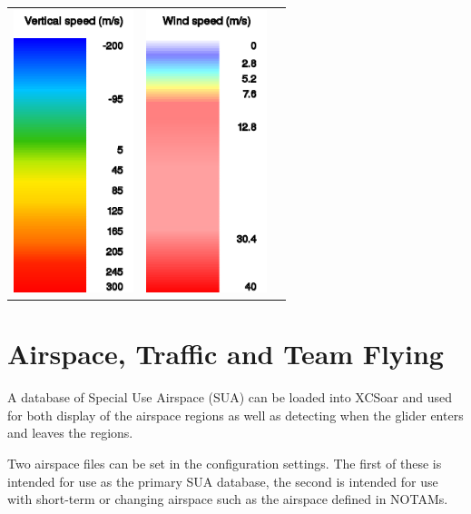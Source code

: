 \documentclass[a4paper,12pt]{refrep}
\begin{document}
\begin{maxipage}
\begin{longtable}{c c c}
\includegraphics[angle=0,width=3.5cm,keepaspectratio='true']{figures/ramp-rasp-vertspeed.png}&
\includegraphics[angle=0,width=3.5cm,keepaspectratio='true']{figures/ramp-rasp-windspeed.png}& \\

\end{longtable}
\end{maxipage}


\chapter{Airspace, Traffic and Team Flying}\label{cha:airspace}
A database of Special Use Airspace (SUA) can be loaded into XCSoar and
used for both display of the airspace regions as well as detecting
when the glider enters and leaves the regions.

Two airspace files can be set in the configuration settings.  The
first of these is intended for use as the primary SUA database, the
second is intended for use with short-term or changing airspace such
as the airspace defined in NOTAMs.
\end{document}
